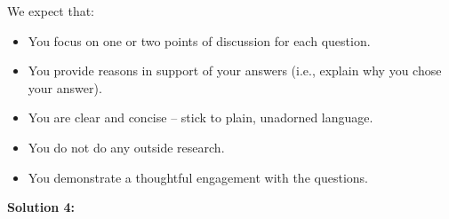 \documentclass[]{article}
\begin{document}
We expect that:
\begin{itemize}
    \item You focus on one or two points of discussion for each question.
    \item You provide reasons in support of your answers (i.e., explain why you chose your answer).
    \item You are clear and concise – stick to plain, unadorned language.
    \item You do not do any outside research.
    \item You demonstrate a thoughtful engagement with the questions.
\end{itemize}

\bigskip

\textbf{Solution 4:}
\end{document}

